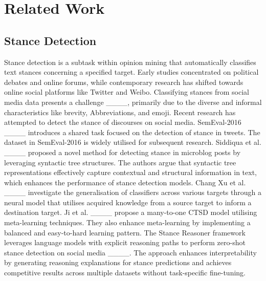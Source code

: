 \section{Related Work}
\subsection{Stance Detection}
Stance detection is a subtask within opinion mining that automatically classifies text stances concerning a specified target. Early studies concentrated on political debates and online forums, while contemporary research has shifted towards online social platforms like Twitter and Weibo. Classifying stances from social media data presents a challenge ____, primarily due to the diverse and informal characteristics like 
brevity, Abbreviations, and emoji. Recent research has attempted to detect the stance of discourses on social media. SemEval-2016 ____ introduces a shared task focused on the detection of stance in tweets. The dataset in SemEval-2016 is widely utilised for subsequent research. Siddiqua et al. ____ proposed a novel method for detecting stance in microblog posts by leveraging syntactic tree structures. The authors argue that syntactic tree representations effectively capture contextual and structural information in text, which enhances the performance of stance detection models. Chang Xu et al. ____ investigate the generalisation of classifiers across various targets through a neural model that utilises acquired knowledge from a source target to inform a destination target. Ji et al. ____ propose a many-to-one CTSD model utilising meta-learning techniques. They also enhance meta-learning by implementing a balanced and easy-to-hard learning pattern. The Stance Reasoner framework leverages language models with explicit reasoning paths to perform zero-shot stance detection on social media ____. The approach enhances interpretability by generating reasoning explanations for stance predictions and achieves competitive results across multiple datasets without task-specific fine-tuning. 


